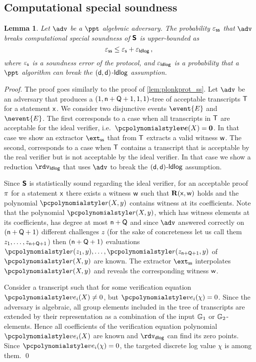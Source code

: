 \documentclass[runningheads,11pt]{llncs}
\def\vec#1{\mathchoice{\mbox{\boldmath$\displaystyle#1$}}
{\mbox{\boldmath$\textstyle#1$}} {\mbox{\boldmath$\scriptstyle#1$}}
{\mbox{\boldmath$\scriptscriptstyle#1$}}}
\newtheorem{lemma}[theorem]{Lemma} \newtheorem{corollary}[theorem]{Corollary}
\theoremstyle{definition} \newtheorem{definition}[theorem]{Definition}
\begin{document}
\subsection{Computational special soundness}
\begin{lemma}
	\label{lem:sonicprot_ss}
	Let $\adv$ be a $\ppt$ algebraic adversary. The probability $\varepsilon_{\mathsf{ss}}$ that
  $\adv$ breaks computational special soundness of $\bm{\mathsf{S}}$ is upper-bounded
  as
	\[
			\varepsilon_{\mathsf{ss}} \leq \varepsilon_{\mathsf{s}} + \varepsilon_{\mathsf{ldlog}}\,,
	\]
	where $\varepsilon_{\mathsf{s}}$ is a soundness error of the protocol, and $\varepsilon_{\mathsf{ldlog}}$ is a
  probability that a $\ppt$ algorithm can break the $(\mathsf{d},
  \mathsf{d})$-$\mathsf{ldlog}$ assumption.
\end{lemma}
\begin{proof}
  The proof goes similarly to the proof of \cref{lem:plonkprot_ss}.
%
  Let $\adv$ be an adversary that produces a
  $(1, \mathsf{n} + \mathsf{Q} + 1, 1, 1)$-tree of acceptable transcripts
  $\mathsf{T}$ for a statement $\mathsf{x}$. We consider two disjunctive events $\event{E}$
  and $\nevent{E}$. The first corresponds to a case when all transcripts in
  $\mathsf{T}$ are acceptable for the ideal verifier,
  i.e.~$\vec{\vereq}(X) = \vec{0}$. In that case we show an extractor $\extss$
  that from $\mathsf{T}$ extracts a valid witness $\mathsf{w}$. The second, corresponds to
  a case when $\mathsf{T}$ contains a transcript that is acceptable by the real
  verifier but is not acceptable by the ideal verifier.  In that case we show a
  reduction $\rdvldlog$ that uses $\adv$ to break the
  $(\mathsf{d}, \mathsf{d})$-$\mathsf{ldlog}$ assumption.

   Since $\bm{\mathsf{S}}$ is statistically sound
  regarding the ideal verifier, for an acceptable proof $\pi$ for a
  statement $\mathsf{x}$ there exists a witness $\mathsf{w}$ such that $\mathbf{R}(\mathsf{x}, \mathsf{w})$
  holds and the polynomial $\p{r}(X, y)$ contains witness at its coefficients.
  Note that the polynomial $\p{r}(X, y)$, which has witness elements at its
  coefficients, has degree at most $\mathsf{n} + \mathsf{Q}$ and since $\adv$
  answered correctly on $(\mathsf{n} + \mathsf{Q} + 1)$ different challenges
  $z$ (for the sake of concreteness let us call them
  $z_1, \ldots, z_{\mathsf{n} + \mathsf{Q} + 1}$) then
  $(\mathsf{n} + \mathsf{Q} + 1)$ evaluations
  $\p{r}(z_1, y), \ldots, \p{r}(z_{\multconstr + \linconstr + 1}, y)$ of
  $\p{r}(X, y)$ are known. The extractor $\extss$ interpolates $\p{r}(X, y)$ and
  reveals the corresponding witness $\mathsf{w}$.

   Consider a transcript such that for some
  verification equation $\vereq_i(X) \neq 0$, but $\vereq_i(\chi) = 0$. Since
  the adversary is algebraic, all group elements included in the tree of
  transcripts are extended by their representation as a combination of the input
  $\mathbb{G}_1$ or $\mathbb{G}_2$-elements. Hence all coefficients of the verification
  equation polynomial $\vereq_i(X)$ are known and $\rdvdlog$ can find its zero
  points. Since $\vereq_i(\chi) = 0$, the targeted discrete log value $\chi$ is
  among them. \qed
\end{proof}
\end{document}
